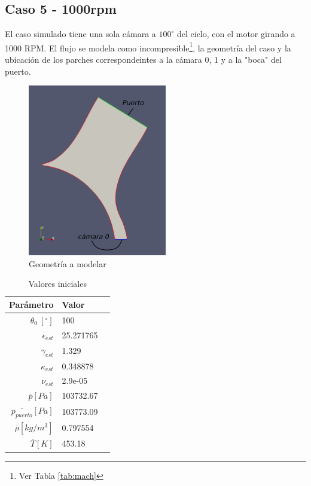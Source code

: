\documentclass[11pt]{article}
\begin{document}
\subsection{Caso 5 - 1000rpm}

El caso simulado tiene una sola cámara a $100^{\circ}$ del ciclo, con el motor
girando a 1000 RPM.
%
El flujo se modela como incompresible\footnote{Ver Tabla \ref{tab:mach}}, la
geometría del caso y la ubicación de los parches correspondeintes a la cámara
0, 1 y a la "boca" del puerto.

\begin{figure}
    \centering
    \includegraphics{caso5.png}
    \caption{Geometría a modelar}
    \label{fig:caso5}
\end{figure}

\begin{table}
    \centering
    \begin{tabular}{rll}\toprule
        Parámetro & Valor \\ \midrule
        $\theta_0\ [^{\circ}]$ & 100 \\
        $\epsilon_{est}$ & 25.271765 \\
        $\gamma_{est}$ & 1.329 \\
        $\kappa_{est}$ & 0.348878 \\
        $\nu_{est}$ & 2.9e-05 \\
        $\overline{p} [Pa]$ & 103732.67 \\
        $\overline{p_{puerto}} [Pa]$ & 103773.09 \\
        $\overline{\rho} [kg/m^3]$ & 0.797554 \\
        $\overline{T} [K]$ & 453.18 \\ \bottomrule
    \end{tabular}
    \caption{Valores iniciales}
    \label{tab:caso5_ci}
\end{table}
\end{document}
